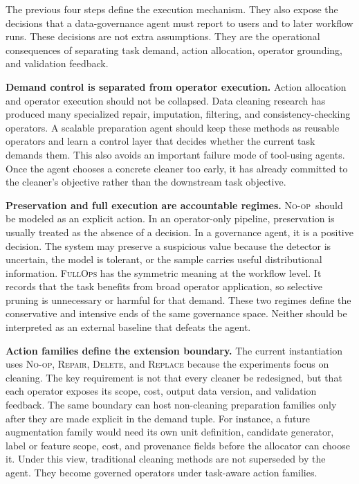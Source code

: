 \documentclass[sigconf, nonacm]{acmart}
\newcommand{\noop}{\textsc{No-op}\xspace}
\newcommand{\repair}{\textsc{Repair}\xspace}
\newcommand{\deleteop}{\textsc{Delete}\xspace}
\newcommand{\replaceop}{\textsc{Replace}\xspace}
\newcommand{\fullops}{\textsc{FullOps}\xspace}
\begin{document}
The previous four steps define the execution mechanism. They also expose the decisions that a data-governance agent must report to users and to later workflow runs. These decisions are not extra assumptions. They are the operational consequences of separating task demand, action allocation, operator grounding, and validation feedback.

\textbf{Demand control is separated from operator execution.}
Action allocation and operator execution should not be collapsed. Data cleaning research has produced many specialized repair, imputation, filtering, and consistency-checking operators. A scalable preparation agent should keep these methods as reusable operators and learn a control layer that decides whether the current task demands them. This also avoids an important failure mode of tool-using agents. Once the agent chooses a concrete cleaner too early, it has already committed to the cleaner's objective rather than the downstream task objective.

\textbf{Preservation and full execution are accountable regimes.}
\noop\ should be modeled as an explicit action. In an operator-only pipeline, preservation is usually treated as the absence of a decision. In a governance agent, it is a positive decision. The system may preserve a suspicious value because the detector is uncertain, the model is tolerant, or the sample carries useful distributional information. \fullops has the symmetric meaning at the workflow level. It records that the task benefits from broad operator application, so selective pruning is unnecessary or harmful for that demand. These two regimes define the conservative and intensive ends of the same governance space. Neither should be interpreted as an external baseline that defeats the agent.

\textbf{Action families define the extension boundary.}
The current instantiation uses \noop, \repair, \deleteop, and \replaceop because the experiments focus on cleaning. The key requirement is not that every cleaner be redesigned, but that each operator exposes its scope, cost, output data version, and validation feedback. The same boundary can host non-cleaning preparation families only after they are made explicit in the demand tuple. For instance, a future augmentation family would need its own unit definition, candidate generator, label or feature scope, cost, and provenance fields before the allocator can choose it. Under this view, traditional cleaning methods are not superseded by the agent. They become governed operators under task-aware action families.
\end{document}
